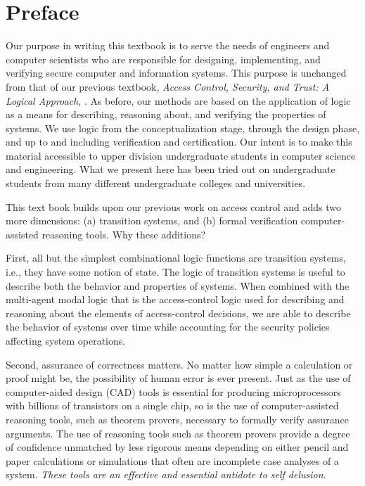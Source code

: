 
\chapter*{Preface}
\label{preface}

Our purpose in writing this textbook is to serve the needs of
engineers and computer scientists who are responsible for designing,
implementing, and verifying secure computer and information
systems. This purpose is unchanged from that of our previous textbook,
\emph{Access Control, Security, and Trust: A Logical Approach},
\cite{ACST}. As before, our methods are based on the application of
logic as a means for describing, reasoning about, and verifying the
properties of systems. We use logic from the conceptualization stage,
through the design phase, and up to and including verification and
certification. Our intent is to make this material accessible to upper
division undergraduate students in computer science and engineering.
What we present here has been tried out on undergraduate students from
many different undergraduate colleges and universities.

This text book builds upon our previous work on access control and
adds two more dimensions: (a) transition systems, and (b) formal
verification computer-assisted reasoning tools. Why these additions?

First, all but the simplest combinational logic functions are
transition systems, i.e., they have some notion of state. The logic of
transition systems is useful to describe both the behavior and
properties of systems. When combined with the multi-agent modal logic
that is the access-control logic used for describing and reasoning
about the elements of access-control decisions, we are able to
describe the behavior of systems over time while accounting for the
security policies affecting system operations.

Second, assurance of correctness matters. No matter how simple a
calculation or proof might be, the possibility of human error is ever
present.  Just as the use of computer-aided design (CAD) tools is
essential for producing microprocessors with billions of transistors
on a single chip, so is the use of computer-assisted reasoning tools,
such as theorem provers, necessary to formally verify assurance
arguments. The use of reasoning tools such as theorem provers provide a
degree of confidence unmatched by less rigorous means depending on
either pencil and paper calculations or simulations that often are
incomplete case analyses of a system. \emph{These tools are an
  effective and essential antidote to self delusion}.

